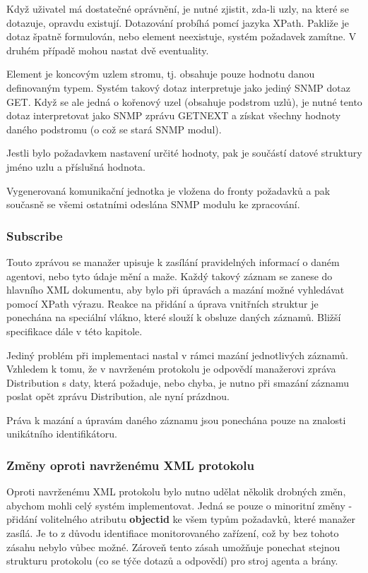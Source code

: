 Když uživatel má dostatečné oprávnění, je nutné zjistit, zda-li uzly, na které se dotazuje, opravdu existují. Dotazování probíhá pomcí jazyka XPath.
Pakliže je dotaz špatně formulován, nebo element neexistuje, systém požadavek zamítne. V druhém případě mohou nastat dvě eventuality.

Element je koncovým uzlem stromu, tj. obsahuje pouze hodnotu danou definovaným typem. Systém takový dotaz interpretuje jako jediný SNMP dotaz GET.
Když se ale jedná o kořenový uzel (obsahuje podstrom uzlů), je nutné tento dotaz interpretovat jako
SNMP zprávu GETNEXT a získat všechny hodnoty daného podstromu (o což se stará SNMP modul).

Jestli bylo požadavkem nastavení určité hodnoty, pak je součástí datové struktury jméno uzlu a příslušná hodnota.

Vygenerovaná komunikační jednotka je vložena do fronty požadavků a pak současně se všemi ostatními odeslána SNMP modulu ke zpracování.

\subsubsection*{Subscribe}
Touto zprávou se manažer upisuje k zasílání pravidelných informací o daném agentovi, nebo tyto údaje mění a maže. Každý takový záznam
se zanese do hlavního XML dokumentu, aby bylo při úpravách a mazání možné vyhledávat pomocí XPath výrazu. Reakce na přidání a úprava
vnitřních struktur je ponechána na speciální vlákno, které slouží k obsluze daných záznamů. Bližší specifikace dále v této kapitole.

Jediný problém při implementaci nastal v rámci mazání jednotlivých záznamů. Vzhledem k tomu, že v navrženém protokolu je odpovědí
manažerovi zpráva Distribution s daty, která požaduje, nebo chyba, je nutno při smazání záznamu poslat opět zprávu Distribution, ale nyní
prázdnou.

Práva k mazání a úpravám daného záznamu jsou ponechána pouze na znalosti unikátního identifikátoru. 


\subsubsection*{Změny oproti navrženému XML protokolu}
Oproti navrženému XML protokolu bylo nutno udělat několik drobných změn, abychom mohli celý systém implementovat. Jedná se pouze o
minoritní změny - přidání volitelného atributu \textbf{objectid} ke všem typům požadavků, které manažer zasílá. Je to z důvodu
identifiace monitorovaného zařízení, což by bez tohoto zásahu nebylo vůbec možné. Zároveň tento zásah umožňuje ponechat stejnou
strukturu protokolu (co se týče dotazů a odpovědí) pro stroj agenta a brány. 


